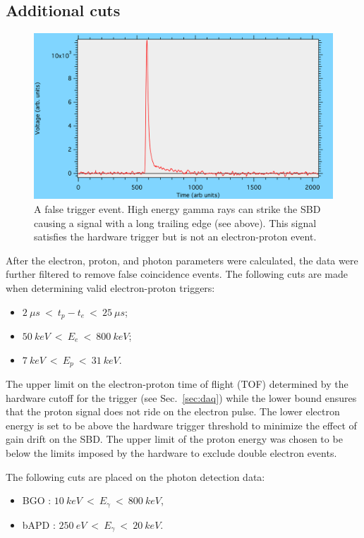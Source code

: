 \documentclass[oneside,12pt]{memoir}
\begin{document}
\subsection{Additional cuts}
\label{sec:cuts}
\begin{figure}
	\centering
	\includegraphics[width=\textwidth]{TraceBad.png}
	\caption[False trigger event.]{A false trigger event. High energy gamma rays can strike the SBD causing a signal with a long trailing edge (see above). This signal satisfies the hardware trigger but is not an electron-proton event.}
	\label{fig:cooper1}
\end{figure}
After the electron, proton, and photon parameters were calculated, the data were further filtered to remove false coincidence events. The following cuts are made when determining valid electron-proton triggers:
\begin{itemize}
	\item $2~\mu s~<~t_p-t_e~<~25~\mu s$;
	\item $50~keV~<~E_e~<~800~keV$;
	\item $7~keV~<~E_p~<~31~keV$.
\end{itemize}
The upper limit on the electron-proton time of flight (TOF) determined by the hardware cutoff for the trigger (see Sec.~\ref{sec:daq}) while the lower bound ensures that the proton signal does not ride on the electron pulse. The lower electron energy is set to be above the hardware trigger threshold to minimize the effect of gain drift on the SBD. The upper limit of the proton energy was chosen to be below the limits imposed by the hardware to exclude double electron events.\par
The following cuts are placed on the photon detection data:
\begin{itemize}
	\item BGO : $10~keV~<~E_\gamma~<~800~keV$,
	\item bAPD : $250~eV~<~E_\gamma~<~20~keV$.
\end{itemize}\par
\end{document}
